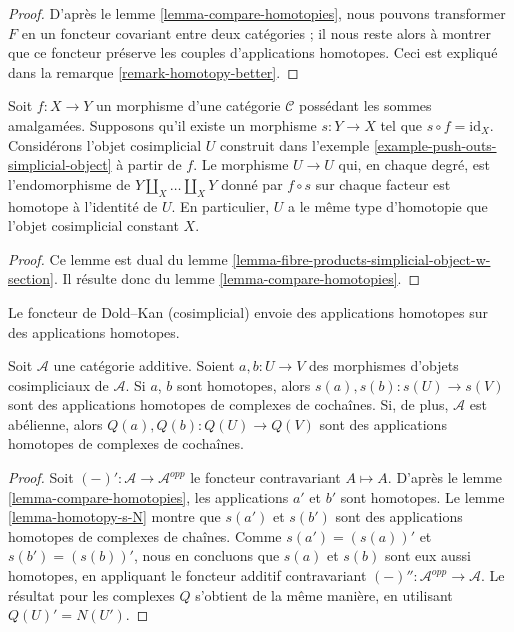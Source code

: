 \begin{proof}
D'après le lemme \ref{lemma-compare-homotopies}, nous pouvons transformer
$F$ en un foncteur covariant entre deux catégories ; il nous reste alors à
montrer que ce foncteur préserve les couples d'applications homotopes.
Ceci est expliqué dans la remarque \ref{remark-homotopy-better}.
\end{proof}

\begin{lemma}
\label{lemma-push-outs-simplicial-object-w-section}
Soit $f : X \to Y$ un morphisme d'une catégorie $\mathcal{C}$ possédant les
sommes amalgamées. Supposons qu'il existe un morphisme $s : Y \to X$ tel que
$s \circ f = \text{id}_X$. Considérons l'objet cosimplicial $U$ construit dans
l'exemple \ref{example-push-outs-simplicial-object} à partir de $f$.
Le morphisme $U \to U$ qui, en chaque degré, est l'endomorphisme de
$Y \amalg_X \ldots \amalg_X Y$ donné par $f \circ s$ sur chaque facteur
est homotope à l'identité de $U$. En particulier, $U$ a le même type
d'homotopie que l'objet cosimplicial constant $X$.
\end{lemma}

\begin{proof}
Ce lemme est dual du
lemme \ref{lemma-fibre-products-simplicial-object-w-section}.
Il résulte donc du lemme \ref{lemma-compare-homotopies}.
\end{proof}

\begin{lemma}
\label{lemma-homotopy-s-Q}
\begin{slogan}
Le foncteur de Dold--Kan (cosimplicial) envoie des applications homotopes sur des applications homotopes.
\end{slogan}
Soit $\mathcal{A}$ une catégorie additive. Soient $a, b : U \to V$ des
morphismes d'objets cosimpliciaux de $\mathcal{A}$. Si $a$, $b$ sont
homotopes, alors $s(a), s(b) : s(U) \to s(V)$ sont des applications homotopes
de complexes de cochaînes. Si, de plus, $\mathcal{A}$ est abélienne, alors
$Q(a), Q(b) : Q(U) \to Q(V)$ sont des applications homotopes de complexes de cochaînes.
\end{lemma}

\begin{proof}
Soit $(-)' : \mathcal{A} \to \mathcal{A}^{opp}$ le foncteur contravariant
$A \mapsto A$. D'après le lemme \ref{lemma-compare-homotopies}, les
applications $a'$ et $b'$ sont homotopes.
Le lemme \ref{lemma-homotopy-s-N} montre que $s(a')$ et $s(b')$ sont des
applications homotopes de complexes de chaînes. Comme
$s(a') = (s(a))'$ et $s(b') = (s(b))'$, nous en concluons que
$s(a)$ et $s(b)$ sont eux aussi homotopes, en appliquant le foncteur additif
contravariant $(-)'' : \mathcal{A}^{opp} \to \mathcal{A}$.
Le résultat pour les complexes $Q$ s'obtient de la même manière,
en utilisant $Q(U)' = N(U')$.
\end{proof}

